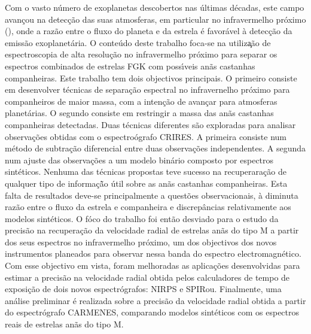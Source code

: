 
\begin{abstract-pt}
    Com o vasto n\'{u}mero de exoplanetas descobertos nas \'{u}ltimas d\'{e}cadas, este campo avan\c{c}ou na detec\c{c}\~{a}o das suas atmosferas, em particular no infravermelho pr\'{o}ximo (\nir{}), onde a razão entre o fluxo do planeta e da estrela \'{e} favor\'{a}vel \`{a} detec\c{c}\~{a}o da emiss\~{a}o exoplanet\'{a}ria.
    O conte\'{u}do deste trabalho foca-se na utiliza\c{}\~{a}o de espectroscopia de alta resolu\c{c}\~{a}o no infravermelho pr\'{o}ximo para separar os espectros combinados de estrelas {FGK} com poss\'{\i}veis an\~{a}s castanhas companheiras.
    Este trabalho tem dois objectivos principais. O primeiro consiste em desenvolver t\'{e}cnicas de separa\c{c}\~{a}o espectral no infravernelho pr\'{o}ximo para companheiros de maior massa, com a inten\c{c}\~{a}o de avan\c{c}ar para atmosferas planet\'{a}rias. O segundo consiste em restringir a massa das an\~{a}s castanhas companheiras detectadas.
    Duas t\'{e}cnicas diferentes s\~{a}o exploradas para analisar observa\c{c}\~{o}es obtidas com o espectro\'{o}grafo {CRIRES}. A primeira consiste num m\'{e}todo de subtra\c{c}\~{a}o diferencial entre duas observa\c{c}\~{o}es independentes. A segunda num ajuste \textchisquared{} das observa\c{c}\~{o}es a um modelo bin\'{a}rio composto por espectros sint\'{e}ticos.
    Nenhuma das t\'{e}cnicas propostas teve sucesso na recuperara\c{c}\~{a}o de qualquer tipo de informa\c{c}\~{ã}o \'{u}til sobre as an\~{a}s castanhas companheiras. Esta falta de resultados deve-se principalmente a quest\~{o}es observacionais, \`{a} diminuta raz\~{a}o entre o fluxo da estrela e companheira e discrep\^{a}ncias relativamente aos modelos sint\'{e}ticos.
    O f\'{o}co do trabalho foi ent\~{a}o desviado para o estudo da precis\~{a}o na recuperação da velocidade radial de estrelas an\~{a}s do tipo M a partir dos seus espectros no infravermelho pr\'{o}ximo, um dos objectivos dos novos instrumentos planeados para observar nessa banda do espectro electromagn\'{e}tico.
    Com esse objectivo em vista, foram melhoradas as aplica\c{c}\~{o}es desenvolvidas para estimar a precis\~{a}o na velocidade radial obtida pelos calculadores de tempo de exposi\c{c}\~{a}o de dois novos \nir{} espectr\'{o}grafos: {NIRPS} e {SPIRou}.
    Finalmente, uma an\'{a}lise preliminar \'{e} realizada sobre a precis\~{a}o da velocidade radial obtida a partir do espectr\'{o}grafo {CARMENES}, comparando modelos sint\'{e}ticos com os espectros reais de estrelas an\~{a}s do tipo M.


\end{abstract-pt}

